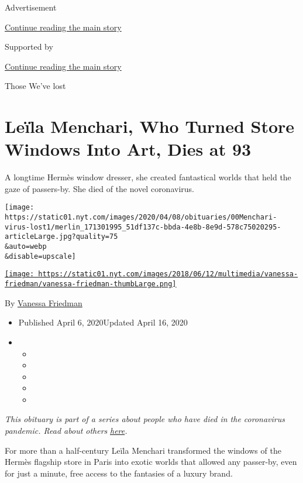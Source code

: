 Advertisement

\protect\hyperlink{after-top}{Continue reading the main story}

Supported by

\protect\hyperlink{after-sponsor}{Continue reading the main story}

Those We've lost

\hypertarget{leuxefla-menchari-who-turned-store-windows-into-art-dies-at-93}{%
\section{Leïla Menchari, Who Turned Store Windows Into Art, Dies at
93}\label{leuxefla-menchari-who-turned-store-windows-into-art-dies-at-93}}

A longtime Hermès window dresser, she created fantastical worlds that
held the gaze of passers-by. She died of the novel coronavirus.

\texttt{[image: https://static01.nyt.com/images/2020/04/08/obituaries/00Menchari-virus-lost1/merlin\_171301995\_51df137c-bbda-4e8b-8e9d-578c75020295-articleLarge.jpg?quality=75\\\&auto=webp\\\&disable=upscale]}

\href{https://www.nytimes.com/by/vanessa-friedman}{\texttt{[image: https://static01.nyt.com/images/2018/06/12/multimedia/vanessa-friedman/vanessa-friedman-thumbLarge.png]}}

By \href{https://www.nytimes.com/by/vanessa-friedman}{Vanessa Friedman}

\begin{itemize}
\item
  Published April 6, 2020Updated April 16, 2020
\item
  \begin{itemize}
  \item
  \item
  \item
  \item
  \item
  \end{itemize}
\end{itemize}

\emph{This obituary is part of a series about people who have died in
the coronavirus pandemic. Read about others}
\href{https://www.nytimes.com/series/people-who-have-died-of-the-coronavirus}{\emph{here}}\emph{.}

For more than a half-century Leïla Menchari transformed the windows of
the Hermès flagship store in Paris into exotic worlds that allowed any
passer-by, even for just a minute, free access to the fantasies of a
luxury brand.


